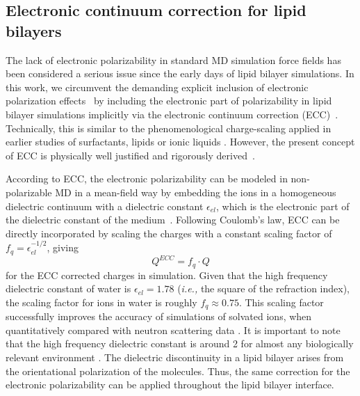 \documentclass[aip,jcp,twocolumn]{revtex4}
\begin{document}
\subsection{Electronic continuum correction for lipid bilayers}\label{section:ecc}
The lack of electronic polarizability in standard MD simulation force fields has been considered a serious issue since the early days of lipid bilayer simulations. In this work, we circumvent the demanding explicit inclusion of electronic polarization effects~\cite{lucas12, chowdhary13} by including the electronic part of polarizability in lipid bilayer simulations implicitly via the electronic continuum correction (ECC)~\cite{leontyev11}. Technically, this is similar to the phenomenological charge-scaling applied in earlier studies of surfactants, lipids or ionic liquids \cite{jonsson86, egberts94, beichel14}. However, the present concept of ECC is physically well justified and rigorously derived~\cite{leontyev09, leontyev10, leontyev11, leontyev14}.

According to ECC, the electronic polarizability can be modeled in non-polarizable MD in a mean-field way by 
embedding the ions in a homogeneous dielectric continuum with a dielectric constant $\epsilon_{el}$, which is the electronic part of the dielectric constant of the medium~\cite{leontyev11}. Following Coulomb's law,  ECC can be directly incorporated by scaling the charges with a constant scaling factor of $f_q = \epsilon _{el} ^{-1/2}$, giving
\begin{equation}
Q^{ECC} = f_q \cdot Q
\end{equation}
for the ECC corrected charges in simulation. 
Given that the  high frequency dielectric constant of water is $\epsilon _{el} = 1.78$ (\textit{i.e.,} the square of the refraction index), the scaling factor for ions in water is roughly $f_q \approx 0.75$. This scaling factor successfully improves the accuracy of simulations of solvated ions, when quantitatively compared with neutron scattering data \cite{kohagen14,kohagen16, Pluharova2014, martinek17}.
It is important to note that the 
high frequency dielectric constant 
is around 2 for almost any biologically relevant environment \cite{leontyev11}.
The dielectric discontinuity in a lipid bilayer arises
from the orientational polarization of the molecules. 
Thus, the same correction for the electronic polarizability can be 
applied throughout the lipid bilayer interface.
\end{document}
